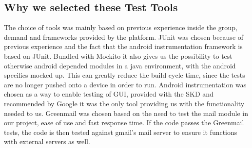 \subsection{Why we selected these Test Tools}
The choice of tools was mainly based on previous experience inside the group, demand and frameworks provided by the platform. 
\newline
\newline
JUnit was chosen because of previous experience and the fact that the android instrumentation framework is based on JUnit. Bundled with Mockito it also gives us the possibility to test otherwise android depended modules in a java environment, with the android specifics mocked up. This can greatly reduce the build cycle time, since the tests are no longer pushed onto a device in order to run. 
\newline
\newline
Android instrumentation was chosen as a way to enable testing of GUI, provided with the SKD and recommended by Google it was the only tool providing us with the functionality needed to us.
\newline
\newline
Greenmail was chosen based on the need to test the mail module in our project, ease of use and fast response time. If the code passes the Greenmail tests, the code is then tested against gmail’s mail server to ensure it functions with external servers as well. 
